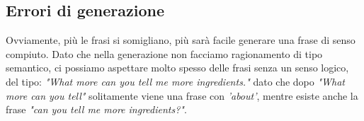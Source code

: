 \subsection{Errori di generazione}
Ovviamente, più le frasi si somigliano, più sarà facile generare una frase di senso compiuto. Dato che nella generazione non facciamo ragionamento di tipo semantico, ci possiamo aspettare molto spesso delle frasi senza un senso logico, del tipo: \textit{"What more can you tell me more ingredients."} dato che dopo \textit{"What more can you tell"} solitamente viene una frase con \textit{'about'}, mentre esiste anche la frase \textit{"can you tell me more ingredients?"}.